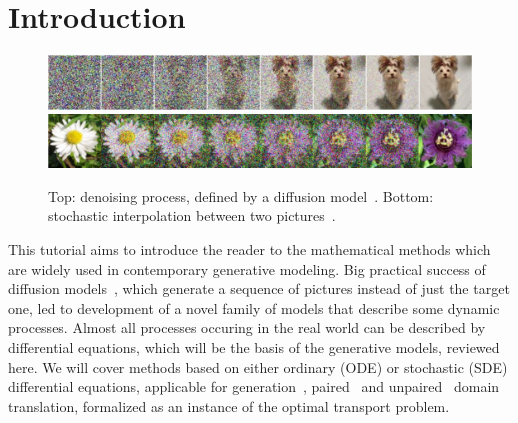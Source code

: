 \section{Introduction}
\begin{figure}[h]
\centering
\includegraphics[width=\textwidth]{images/diffusion.png}
\includegraphics[width=\textwidth]{images/bridge.png}
\caption{Top: denoising process, defined by a diffusion model~\cite{song2020score}. Bottom: stochastic interpolation between two pictures~\cite{albergo2023stochastic}.}
\end{figure}

This tutorial aims to introduce the reader to the mathematical methods which are widely used in contemporary generative modeling. Big practical success of diffusion models~\cite{ho2020denoising, de2021diffusion, song2020score}, which generate a sequence of pictures instead of just the target one, led to development of a novel family of models that describe some dynamic processes. Almost all processes occuring in the real world can be described by differential equations, which will be the basis of the generative models, reviewed here. We will cover methods based on either ordinary (ODE) or stochastic (SDE) differential equations, applicable for generation~\cite{song2020score, lipman2022flow, tong2023conditional, albergo2022building, albergo2023stochastic}, paired~\cite{tong2023conditional, albergo2022building, albergo2023stochastic, liu20232} and unpaired~\cite{liu2022flow, shi2023diffusion, korotin2022neural, gushchin2022entropic} domain translation, formalized as an instance of the optimal transport problem.
